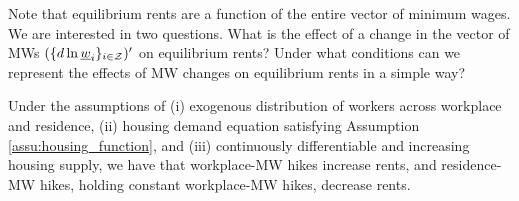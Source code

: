 Note that equilibrium rents are a function of the entire vector of minimum wages. 
We are interested in two questions. What is the effect of a change in the vector of 
MWs $(\{d \ln \underline{w}_i\}_{i\in\mathcal{Z}})'$ on equilibrium rents? Under what conditions can we 
represent the effects of MW changes on equilibrium rents in a simple way?

\begin{prop}\label{prop:comparative_statics}
    Under the assumptions of (i) exogenous distribution of workers across workplace 
    and residence, (ii) housing demand equation satisfying Assumption 
    \ref{assu:housing_function}, and (iii) continuously differentiable and increasing
    housing supply, we have that workplace-MW hikes increase rents, and residence-MW 
    hikes, holding constant workplace-MW hikes, decrease rents.
\end{prop}

